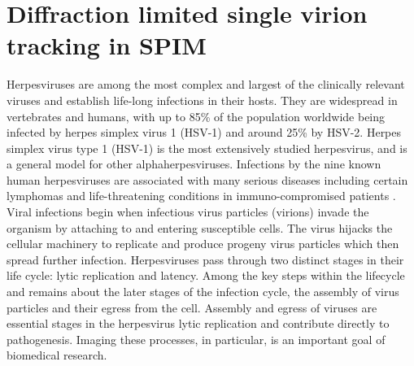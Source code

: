 \ifpdf
    \graphicspath{{Chapters/spt/Figs/Raster/}{Chapters/spt/Figs/PDF/}{Chapters/spt/Figs/}}
\else
    \graphicspath{{Chapters/spt/Figs/Vector/}{Chapters/spt/Figs/}}
\fi

\chapter{Diffraction limited single virion tracking in SPIM}\label{chapter:spt}


Herpesviruses are among the most complex and largest of the clinically relevant viruses and establish life-long infections in their hosts.
They are widespread in vertebrates and humans, with up to 85\% of the population worldwide being infected by herpes simplex virus 1 (HSV-1) and around 25\% by HSV-2.
Herpes simplex virus type 1 (HSV-1) is the most extensively studied herpesvirus, and is a general model for other alphaherpesviruses.
Infections by the nine known human herpesviruses are associated with many serious diseases including certain lymphomas and life-threatening conditions in immuno-compromised patients \cite{[1]}.
Viral infections begin when infectious virus particles (virions) invade the organism by attaching to and entering susceptible cells.
The virus hijacks the cellular machinery to replicate and produce progeny virus particles which then spread further infection.
Herpesviruses pass through two distinct stages in their life cycle: lytic replication and latency.
Among the key steps within the lifecycle and remains about the later
stages of the infection cycle, the assembly of virus particles and their egress from the cell.
Assembly and egress of viruses are essential stages in the herpesvirus lytic replication and contribute directly to pathogenesis.
Imaging these processes, in particular, is an important goal of biomedical research.

